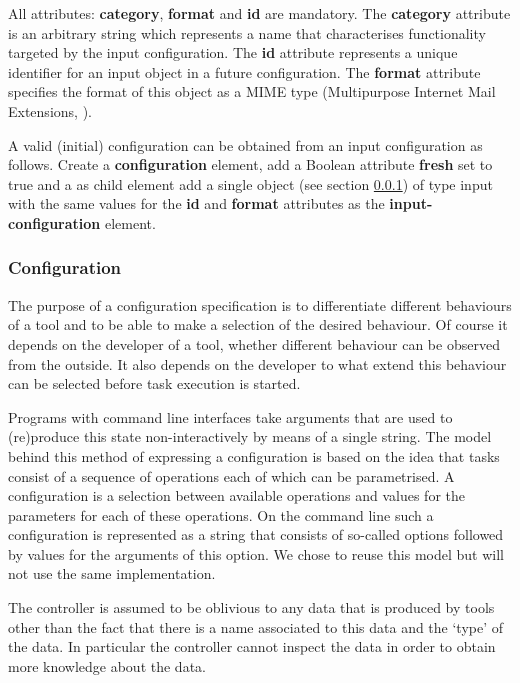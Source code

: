\documentclass{article}
\begin{document}
   All attributes: \textbf{category}, \textbf{format} and \textbf{id} are
   mandatory.  The \textbf{category} attribute is an arbitrary string which
   represents a name that characterises functionality targeted by the input
   configuration. The \textbf{id} attribute represents a unique identifier for
   an input object in a future configuration. The \textbf{format} attribute
   specifies the format of this object as a MIME type (Multipurpose Internet
   Mail Extensions, \cite{rfc2822}).

   A valid (initial) configuration can be obtained from an input configuration
   as follows.  Create a \textbf{configuration} element, add a Boolean
   attribute \textbf{fresh} set to true and a as child element add a single
   object (see section \ref{ss:implementation_configuration}) of type input
   with the same values for the \textbf{id} and \textbf{format} attributes as
   the \textbf{input-configuration} element.

  \subsubsection{Configuration} \label{ss:implementation_configuration}

   The purpose of a configuration specification is to differentiate different
   behaviours of a tool and to be able to make a selection of the desired
   behaviour. Of course it depends on the developer of a tool, whether
   different behaviour can be observed from the outside. It also depends on the
   developer to what extend this behaviour can be selected before task
   execution is started.

   Programs with command line interfaces take arguments that are used to
   (re)produce this state non-interactively by means of a single string. The
   model behind this method of expressing a configuration is based on the idea
   that tasks consist of a sequence of operations each of which can be
   parametrised. A configuration is a selection between available operations
   and values for the parameters for each of these operations. On the command
   line such a configuration is represented as a string that consists of
   so-called options followed by values for the arguments of this option. We
   chose to reuse this model but will not use the same implementation.

   The controller is assumed to be oblivious to any data that is produced by
   tools other than the fact that there is a name associated to this data and
   the `type' of the data.  In particular the controller cannot inspect the
   data in order to obtain more knowledge about the data.
\end{document}
